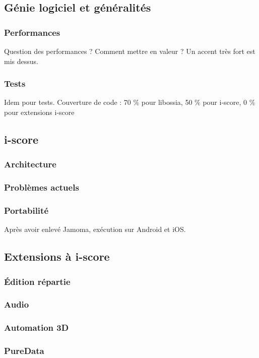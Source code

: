 \documentclass[french,a4paper]{book}
\begin{document}
\subsection{Génie logiciel et généralités}
\subsubsection{Performances}
Question des performances ? Comment mettre en valeur ? 
Un accent très fort est mis dessus.

\subsubsection{Tests}
Idem pour tests.
Couverture de code : 70 \% pour libossia, 50 \% pour i-score, 0 \% pour extensions i-score

\subsection{i-score}
\subsubsection{Architecture}
\subsubsection{Problèmes actuels}
\subsubsection{Portabilité}
Après avoir enlevé Jamoma, exécution sur Android et iOS.
    
\subsection{Extensions à i-score}
\subsubsection{Édition répartie}
\subsubsection{Audio}
\subsubsection{Automation 3D}
\subsubsection{PureData}
\end{document}

